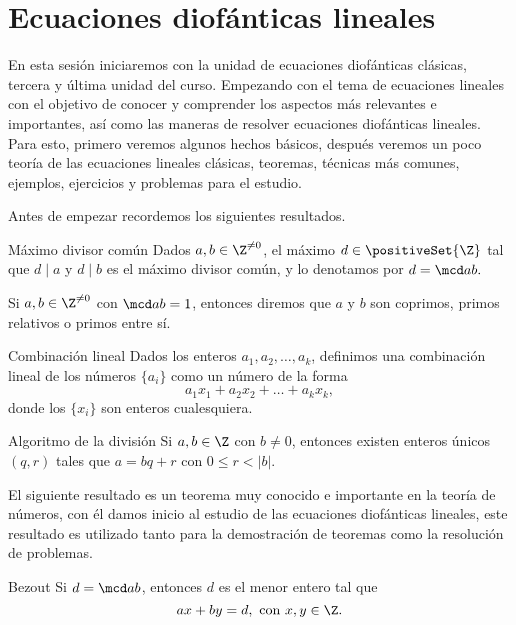 \section{Ecuaciones diofánticas lineales}

En esta sesión iniciaremos con la unidad de ecuaciones diofánticas clásicas, tercera y última unidad del curso.
Empezando con el tema de ecuaciones lineales con el objetivo de conocer y comprender los aspectos más relevantes e importantes,
así como las maneras de resolver ecuaciones diofánticas lineales.
Para esto, primero veremos algunos hechos básicos, después veremos un poco teoría de las ecuaciones lineales clásicas,
teoremas, técnicas más comunes, ejemplos, ejercicios y problemas para el estudio.

Antes de empezar recordemos los siguientes resultados.

\begin{definition.box}{Máximo divisor común}{}
    Dados $a,b \in \Z^{\neq 0}$, el máximo $d \in \positiveSet{\Z}$ tal que $d \mid a$ y $d \mid b$ es el máximo divisor común,
    y lo denotamos por $d = \mcd a b.$
\end{definition.box}

\begin{definition.box}{}{}
    Si $a,b \in \Z^{\neq 0}$ con $\mcd a b = 1$, entonces diremos que $a$ y $b$ son coprimos, primos relativos o primos entre sí.
\end{definition.box}

\begin{definition.box}{Combinación lineal}{}
    Dados los enteros $a_1, a_2, \ldots, a_k$, definimos una combinación lineal de los números $\{a_i\}$ como un número de la forma
    \[
        a_1 x_1 + a_2 x_2 + \ldots + a_k x_k,
    \]
    donde los $\{x_i\}$ son enteros cualesquiera.
\end{definition.box}

\begin{theorem.box}{Algoritmo de la división}{}
    Si $a, b \in \Z$ con $b \neq 0$, entonces existen enteros únicos $(q,r)$ tales que $a = bq + r$ con $0 \leq r < |b|$.
\end{theorem.box}

El siguiente resultado es un teorema muy conocido e importante en la teoría de números, con él damos inicio al
estudio de las ecuaciones diofánticas lineales, este resultado es utilizado tanto para la demostración de teoremas como
la resolución de problemas.

\begin{theorem.box}{Bezout}{}
    Si $d = \mcd a b$, entonces $d$ es el menor entero tal que
    \[
        ax + by = d,\ \text{con}\ x,y \in \Z.
    \]
\end{theorem.box}

